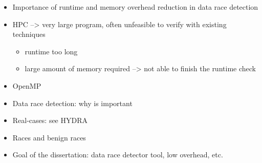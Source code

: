 \begin{itemize}
  \item Importance of runtime and memory overhead reduction in data race
    detection
  \item HPC --> very large program, often unfeasible to verify with
    existing techniques
    \begin{itemize}
    \item runtime too long
    \item large amount of memory required --> not able to finish the
      runtime check
    \end{itemize}
  \item OpenMP
  \item Data race detection: why is important
  \item Real-cases: see HYDRA
  \item Races and benign races
  \item Goal of the dissertation: data race detector tool, low overhead, etc.
\end{itemize}

